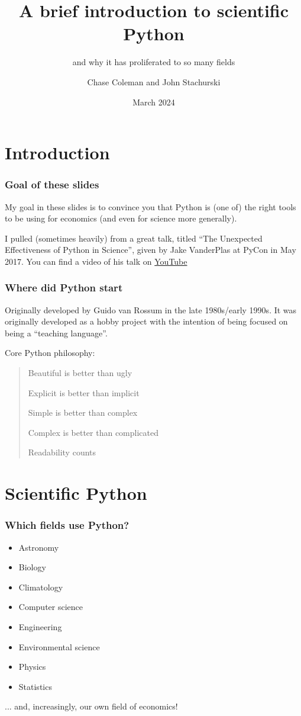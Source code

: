\documentclass[
    xcolor={svgnames,dvipsnames},
    hyperref={colorlinks, citecolor=DeepPink4, linkcolor=DarkRed, urlcolor=DarkBlue}
]{beamer}  %
\title{A brief introduction to scientific Python}
\subtitle{and why it has proliferated to so many fields}
\author{Chase Coleman and John Stachurski}
\date{March 2024}
\newcommand{\1}{\mathbbm 1}
\begin{document}
\begin{frame}
  \titlepage
\end{frame}

\section{Introduction}
\begin{frame}
    \frametitle{Goal of these slides}

    My goal in these slides is to convince you that Python is (one of) the right tools to be using
    for economics (and even for science more generally).

    I pulled (sometimes heavily) from a great talk, titled ``The Unexpected Effectiveness of
    Python in Science'', given by Jake VanderPlas at PyCon in May 2017. You can find a video of
    his talk on \href{https://youtu.be/ZyjCqQEUa8o?si=EeF1CUmf5SnbvUuj}{YouTube}

\end{frame}

\begin{frame}
    \frametitle{Where did Python start}

    Originally developed by Guido van Rossum in the late 1980s/early 1990s. It was originally
    developed as a hobby project with the intention of being focused on being a ``teaching
    language''.

    Core Python philosophy:

    \vspace{0.25cm}
    \begin{quote}
        Beautiful is better than ugly

        Explicit is better than implicit

        Simple is better than complex

        Complex is better than complicated

        Readability counts
    \end{quote}

\end{frame}

\section{Scientific Python}
\begin{frame}
    \frametitle{Which fields use Python?}

    \begin{itemize}
        \item Astronomy
        \item Biology
        \item Climatology
        \item Computer science
        \item Engineering
        \item Environmental science
        \item Physics
        \item Statistics
    \end{itemize}

    ... and, increasingly, our own field of economics!

\end{frame}
\end{document}
